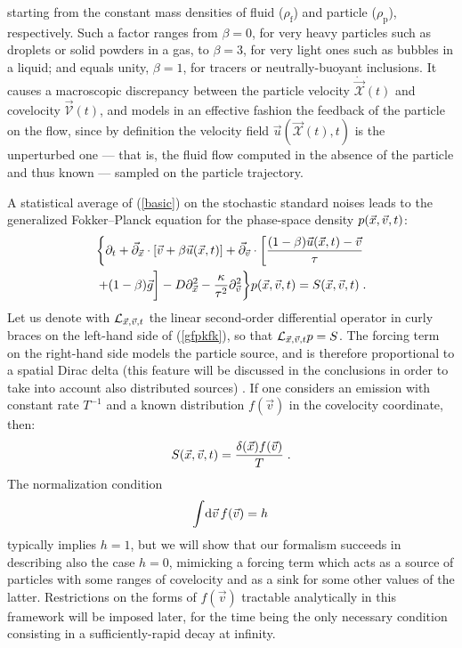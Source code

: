 starting from the constant mass densities of fluid ($\rho_{\mathrm{f}}$) and particle ($\rho_{\mathrm{p}}$), respectively.
Such a factor ranges from $\beta=0$, for very heavy particles such as droplets or solid powders in a gas, to $\beta=3$,
for very light ones such as bubbles in a liquid; and equals unity, $\beta=1$, for tracers or neutrally-buoyant inclusions.
It causes a macroscopic discrepancy between the particle velocity $\dot{\vec{\mathcal{X}}}(t)$ and covelocity $\vec{\mathcal{V}}(t)$,
and models in an effective fashion the feedback of the particle on the flow, since by definition the velocity field $\vec{u}(\vec{\mathcal{X}}(t),t)$
is the unperturbed one --- that is, the fluid flow computed in the absence of the particle and thus known --- sampled on the particle trajectory.

A statistical average of (\ref{basic}) on the stochastic standard noises \cite{C43,G85,R89,V07}
leads to the generalized Fokker--Planck equation for the phase-space density $p(\vec{x},\vec{v},t)$:
\begin{eqnarray} \label{gfpkfk}
 \left\{\partial_t+\vec{\partial}_{\vec{x}}\cdot[\vec{v}+\beta\vec{u}(\vec{x},t)]+\vec{\partial}_{\vec{v}}\cdot\left[\frac{(1-\beta)\vec{u}(\vec{x},t)-\vec{v}}{\tau}\right.\right.\nonumber\\
 +(1-\beta)\vec{g}\bigg]-D\partial^2_{\vec{x}}-\frac{\kappa}{\tau^2}\partial^2_{\vec{v}}\bigg\}p(\vec{x},\vec{v},t)=S(\vec{x},\vec{v},t)\;.
\end{eqnarray}
Let us denote with $\mathcal{L}_{\vec{x},\vec{v},t}$ the linear second-order differential operator in curly braces on the left-hand side of (\ref{gfpkfk}),
so that $\mathcal{L}_{\vec{x},\vec{v},t}p=S$. The forcing term on the right-hand side models the particle source, and is therefore proportional to a spatial Dirac delta
(this feature will be discussed in the conclusions in order to take into account also distributed sources) \cite{MAM11,CMAM2006,CMAM2007,CMAM07,T18}.
If one considers an emission with constant rate $T^{-1}$ and a known distribution $f(\vec{v})$ in the covelocity coordinate, then:
\begin{equation} \label{source}
 S(\vec{x},\vec{v},t)=\frac{\delta(\vec{x})f(\vec{v})}{T}\;.
\end{equation}
The normalization condition
\begin{equation} \label{norm}
 \!\int\!\mathrm{d}\vec{v}\,f(\vec{v})=h
\end{equation}
typically implies $h=1$, but we will show that our formalism succeeds in describing also the case $h=0$, mimicking a forcing term
which acts as a source of particles with some ranges of covelocity and as a sink for some other values of the latter.
Restrictions on the forms of $f(\vec{v})$ tractable analytically in this framework will be imposed later,
for the time being the only necessary condition consisting in a sufficiently-rapid decay at infinity.

